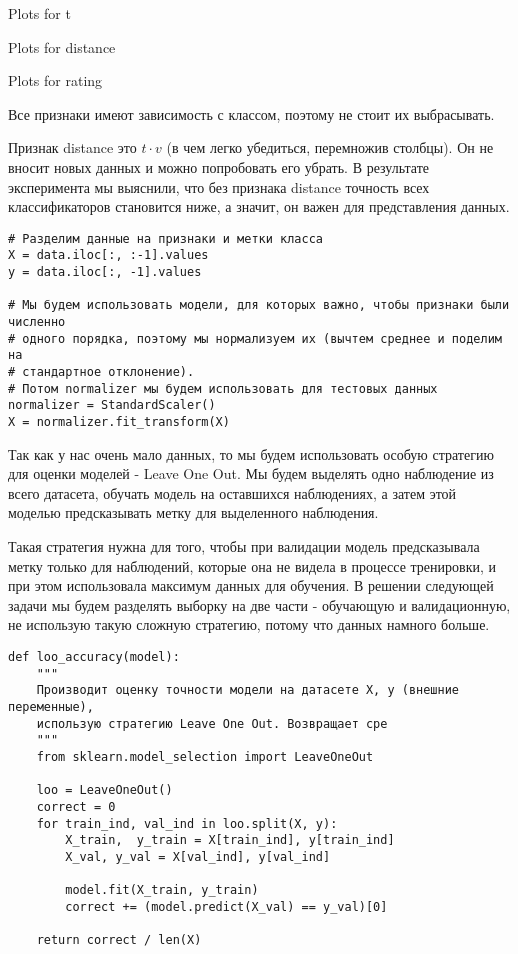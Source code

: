 \begin{center}
    Plots for t
\end{center}


\begin{center}
    Plots for distance   
\end{center}


\begin{center}
    Plots for rating  
\end{center}


Все признаки имеют зависимость с классом, поэтому не стоит их выбрасывать.

Признак distance это $t \cdot v$ (в чем легко убедиться, перемножив столбцы). Он не вносит новых данных 
и можно попробовать его убрать. В результате эксперимента мы выяснили, что без признака distance точность 
всех классификаторов становится ниже, а значит, он важен для представления данных.

\begin{verbatim}
# Разделим данные на признаки и метки класса
X = data.iloc[:, :-1].values
y = data.iloc[:, -1].values

# Мы будем использовать модели, для которых важно, чтобы признаки были численно 
# одного порядка, поэтому мы нормализуем их (вычтем среднее и поделим на 
# стандартное отклонение).
# Потом normalizer мы будем использовать для тестовых данных
normalizer = StandardScaler()
X = normalizer.fit_transform(X)
\end{verbatim}

Так как у нас очень мало данных, то мы будем использовать особую стратегию для оценки моделей - Leave One Out. Мы будем выделять одно наблюдение из всего датасета, обучать модель на оставшихся наблюдениях, а затем этой моделью предсказывать метку для выделенного наблюдения.

Такая стратегия нужна для того, чтобы при валидации модель предсказывала метку только для наблюдений, которые она не видела в процессе тренировки, и при этом использовала максимум данных для обучения. В решении следующей задачи мы будем разделять выборку на две части - обучающую и валидационную, не использую такую сложную стратегию, потому что данных намного больше.

\begin{verbatim}
def loo_accuracy(model):
    """
    Производит оценку точности модели на датасете X, y (внешние переменные), 
    использую стратегию Leave One Out. Возвращает сре
    """
    from sklearn.model_selection import LeaveOneOut

    loo = LeaveOneOut()
    correct = 0
    for train_ind, val_ind in loo.split(X, y):
        X_train,  y_train = X[train_ind], y[train_ind]
        X_val, y_val = X[val_ind], y[val_ind]
        
        model.fit(X_train, y_train)
        correct += (model.predict(X_val) == y_val)[0]
        
    return correct / len(X)
\end{verbatim}

